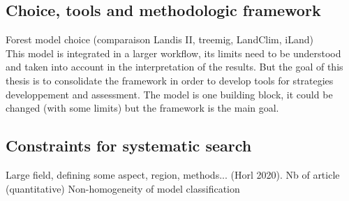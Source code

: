 \documentclass{article}
\begin{document}
\subsection{Choice, tools and methodologic framework}

Forest model choice (comparaison Landis II, treemig, LandClim, iLand) \\
This model is integrated in a larger workflow, its limits need to be understood and taken into account in the interpretation of the results. But the goal of this thesis is to consolidate the framework in order to develop tools for strategies developpement and assessment. The model is one building block, it could be changed (with some limits) but the framework is the main goal. \\

\subsection{Constraints for systematic search}
Large field, defining some aspect, region, methods... (Horl 2020). Nb of article (quantitative)
Non-homogeneity of model classification

\printbibliography
\end{document}
